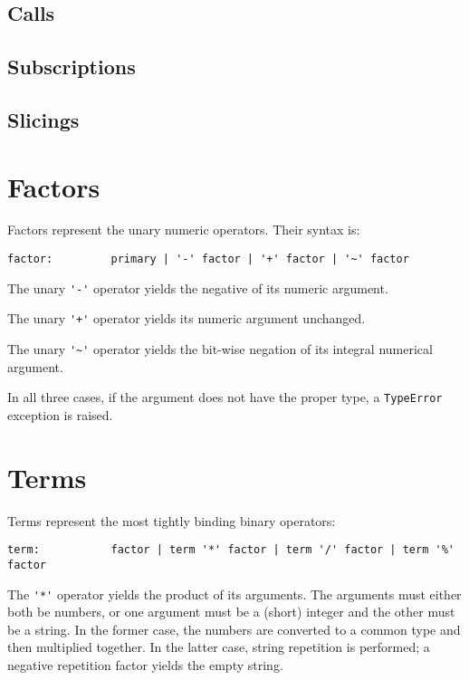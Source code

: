 \subsection{Calls}

\subsection{Subscriptions}

\subsection{Slicings}

\section{Factors}

Factors represent the unary numeric operators.
Their syntax is:

\begin{verbatim}
factor:         primary | '-' factor | '+' factor | '~' factor
\end{verbatim}

The unary \verb/'-'/ operator yields the negative of its numeric argument.

The unary \verb/'+'/ operator yields its numeric argument unchanged.

The unary \verb/'~'/ operator yields the bit-wise negation of its
integral numerical argument.

In all three cases, if the argument does not have the proper type,
a {\tt TypeError} exception is raised.

\section{Terms}

Terms represent the most tightly binding binary operators:

\begin{verbatim}
term:           factor | term '*' factor | term '/' factor | term '%' factor
\end{verbatim}

The \verb/'*'/ operator yields the product of its arguments.
The arguments must either both be numbers, or one argument must be
a (short) integer and the other must be a string.
In the former case, the numbers are converted to a common type
and then multiplied together.
In the latter case, string repetition is performed; a negative
repetition factor yields the empty string.

